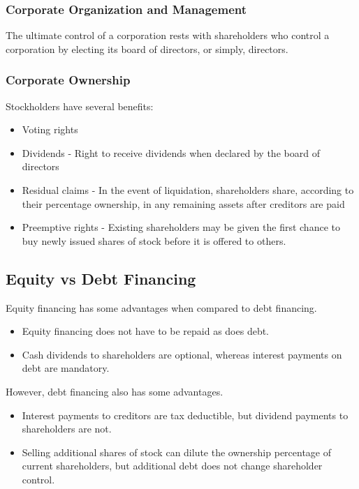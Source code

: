 \documentclass[../main.tex]{subfiles}
\begin{document}
	\subsubsection{Corporate Organization and Management}
	
	The ultimate control of a corporation rests with shareholders who  control 
	a corporation by electing its board of directors, or simply, directors. 
	
	\subsubsection{Corporate Ownership}
	
	Stockholders have several benefits:
	\begin{itemize}[noitemsep]
		\item Voting rights
		\item Dividends - Right to receive dividends when declared by the board 
		of directors
		\item Residual claims - In the event of liquidation, shareholders 
		share, according to their percentage ownership, in any remaining assets 
		after creditors are paid
		\item Preemptive rights - Existing shareholders may be given the first 
		chance to buy newly issued shares of stock before it is offered to 
		others.
	\end{itemize}
	
	\subsection{Equity vs Debt Financing}
	
	Equity financing has some advantages when compared to debt financing. 
	\begin{itemize}[noitemsep]
		\item Equity financing does not have to be repaid as does debt.
		\item Cash dividends to shareholders are optional, whereas interest 
		payments on debt are mandatory.
	\end{itemize}
	
	However, debt financing also has some advantages. 
	\begin{itemize}[noitemsep]
		\item Interest payments to creditors are tax deductible, but dividend 
		payments to shareholders are not.
		\item Selling additional shares of stock can dilute the ownership 
		percentage of current shareholders, but additional debt does not change 
		shareholder control. 
	\end{itemize}
\end{document}
